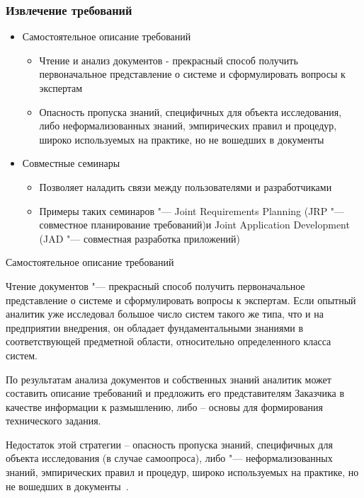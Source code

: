 \documentclass{../industrial-development}
\begin{document}
\begin{frame} \frametitle{Извлечение требований}
\begin{itemize}

\item \alert{Самостоятельное описание требований}
\begin{itemize} 
\item Чтение и анализ документов - прекрасный способ получить первоначальное представление о системе и сформулировать вопросы к экспертам
\item Опасность пропуска знаний, специфичных для объекта исследования, либо неформализованных знаний, эмпирических правил и процедур, широко используемых на практике, но не вошедших в документы
\end{itemize}

\item \alert{Совместные семинары}
\begin{itemize} 
\item Позволяет наладить связи между пользователями и разработчиками
\item Примеры таких семинаров "--- Joint Requirements Planning (JRP "--- совместное планирование требований)и Joint Application Development (JAD "--- совместная разработка приложений)
\end{itemize}

\end{itemize}
\end{frame}
\lecturenotes

\alert{Самостоятельное описание требований}

Чтение документов "--- прекрасный способ получить первоначальное представление о системе и сформулировать вопросы к экспертам. Если опытный аналитик уже исследовал большое число систем такого же типа, что и на предприятии внедрения, он обладает фундаментальными знаниями в соответствующей предметной области, относительно определенного класса систем.

По результатам анализа документов и собственных знаний аналитик может составить описание требований и предложить его представителям Заказчика в качестве информации к размышлению, либо – основы для формирования технического задания.

Недостаток этой стратегии – опасность пропуска знаний, специфичных для объекта исследования (в случае самоопроса), либо "--- неформализованных знаний, эмпирических правил и процедур, широко используемых на практике, но не вошедших в документы~\cite[с.~33]{Maglinec}.
\end{document}
